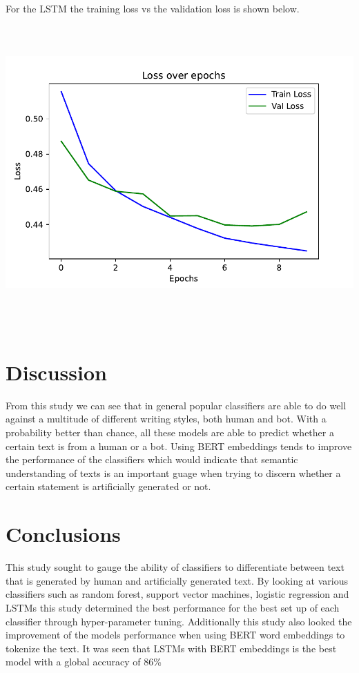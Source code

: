 \documentclass[12pt]{article}
\begin{document}
 For the LSTM the training loss vs the validation loss is shown below.
\\ \includegraphics[width=16cm, height=12cm]{bert_loss}\\

\section{Discussion}
From this study we can see that in general popular classifiers are able to do well against a multitude of different writing styles, both human and bot. With a probability better than chance, all these models are able to predict whether a certain text is from a human or a bot. Using BERT embeddings tends to improve the performance of the classifiers which would indicate that semantic understanding of texts is an important guage when trying to discern whether a certain statement is artificially generated or not. 

\section{Conclusions}
This study sought to gauge the ability of classifiers to differentiate between text that is generated by human and artificially generated text. By looking at various classifiers such as random forest, support vector machines, logistic regression and LSTMs  this study determined the best performance for the best set up of each classifier through hyper-parameter tuning. Additionally this study also looked the improvement of the models performance when using BERT word embeddings to tokenize the text. It was seen that LSTMs with BERT embeddings is the best model with a global accuracy of 86\%  


\end{document}

